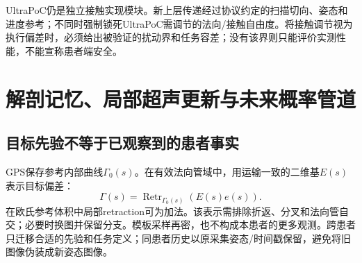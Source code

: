 \documentclass[UTF8,11pt,a4paper,fontset=fandol]{ctexart}
\numberwithin{equation}{section}
\theoremstyle{definition}
\DeclareMathOperator{\Retr}{Retr}
\begin{document}
UltraPoC仍是独立接触实现模块。新上层传递经过协议约定的扫描切向、姿态和进度参考；不同时强制锁死UltraPoC需调节的法向/接触自由度。将接触调节视为执行偏差时，必须给出被验证的扰动界和任务容差；没有该界则只能评价实测性能，不能宣称患者端安全。

\section{解剖记忆、局部超声更新与未来概率管道}\label{sec:belief}
\subsection{目标先验不等于已观察到的患者事实}
GPS保存参考内部曲线$\Gamma_0(s)$。在有效法向管域中，用运输一致的二维基$E(s)$表示目标偏差：
\begin{equation}
 \Gamma(s)=\Retr_{\Gamma_0(s)}(E(s)e(s)).
 \label{eq:targetresidual}
\end{equation}
在欧氏参考体积中局部retraction可为加法。该表示需排除折返、分叉和法向管自交；必要时换图并保留分支。模板采样再密，也不构成本患者的更多观测。跨患者只迁移合适的先验和任务定义；同患者历史以原采集姿态/时间戳保留，避免将旧图像伪装成新姿态图像。
\end{document}
